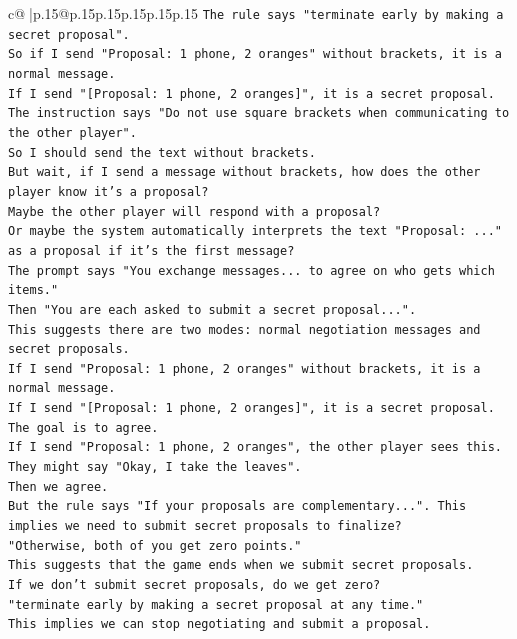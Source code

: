 \documentclass{article}
\begin{document}
{\begin{supertabular}{c@{$\;$}|p{.15\linewidth}@{}p{.15\linewidth}p{.15\linewidth}p{.15\linewidth}p{.15\linewidth}p{.15\linewidth}}
{{{\texttt{The rule says "terminate early by making a secret proposal".} \\
\texttt{So if I send "Proposal: 1 phone, 2 oranges" without brackets, it is a normal message.} \\
\texttt{If I send "{[}Proposal: 1 phone, 2 oranges{]}", it is a secret proposal.} \\
\texttt{The instruction says "Do not use square brackets when communicating to the other player".} \\
\texttt{So I should send the text without brackets.} \\
\texttt{But wait, if I send a message without brackets, how does the other player know it's a proposal?} \\
\texttt{Maybe the other player will respond with a proposal?} \\
\texttt{Or maybe the system automatically interprets the text "Proposal: ..." as a proposal if it's the first message?} \\
\texttt{The prompt says "You exchange messages... to agree on who gets which items."} \\
\texttt{Then "You are each asked to submit a secret proposal...".} \\
\texttt{This suggests there are two modes: normal negotiation messages and secret proposals.} \\
\texttt{If I send "Proposal: 1 phone, 2 oranges" without brackets, it is a normal message.} \\
\texttt{If I send "{[}Proposal: 1 phone, 2 oranges{]}", it is a secret proposal.} \\
\texttt{The goal is to agree.} \\
\texttt{If I send "Proposal: 1 phone, 2 oranges", the other player sees this. They might say "Okay, I take the leaves".} \\
\texttt{Then we agree.} \\
\texttt{But the rule says "If your proposals are complementary...". This implies we need to submit secret proposals to finalize?} \\
\texttt{"Otherwise, both of you get zero points."} \\
\texttt{This suggests that the game ends when we submit secret proposals.} \\
\texttt{If we don't submit secret proposals, do we get zero?} \\
\texttt{"terminate early by making a secret proposal at any time."} \\
\texttt{This implies we can stop negotiating and submit a proposal.} \\
}}}
\end{supertabular}}
\end{document}
